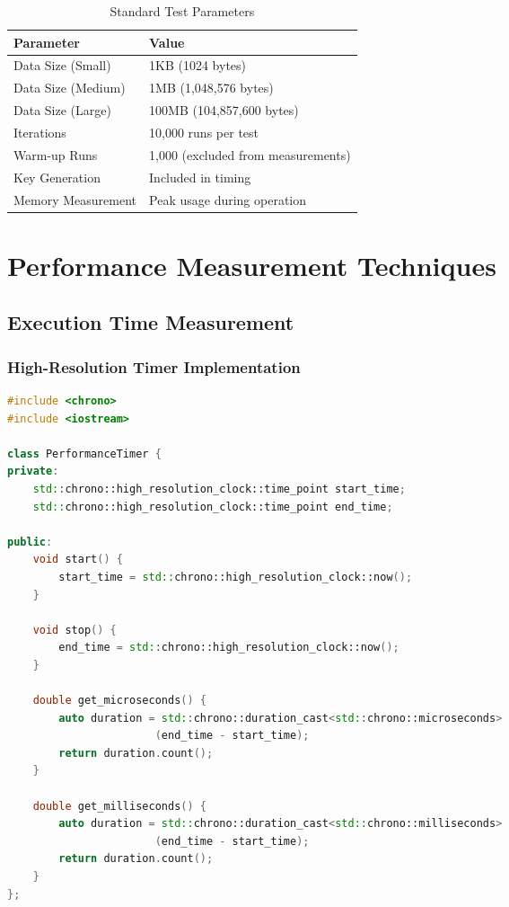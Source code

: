\documentclass[12pt,a4paper]{article}
\begin{document}
\begin{table}[h]
\centering
\caption{Standard Test Parameters}
\begin{tabular}{|l|l|}
\hline
\textbf{Parameter} & \textbf{Value} \\
\hline
Data Size (Small) & 1KB (1024 bytes) \\
Data Size (Medium) & 1MB (1,048,576 bytes) \\
Data Size (Large) & 100MB (104,857,600 bytes) \\
Iterations & 10,000 runs per test \\
Warm-up Runs & 1,000 (excluded from measurements) \\
Key Generation & Included in timing \\
Memory Measurement & Peak usage during operation \\
\hline
\end{tabular}
\end{table}

\section{Performance Measurement Techniques}

\subsection{Execution Time Measurement}

\subsubsection{High-Resolution Timer Implementation}

\begin{lstlisting}[language=C++, caption=High-Resolution Timer Code]
#include <chrono>
#include <iostream>

class PerformanceTimer {
private:
    std::chrono::high_resolution_clock::time_point start_time;
    std::chrono::high_resolution_clock::time_point end_time;
    
public:
    void start() {
        start_time = std::chrono::high_resolution_clock::now();
    }
    
    void stop() {
        end_time = std::chrono::high_resolution_clock::now();
    }
    
    double get_microseconds() {
        auto duration = std::chrono::duration_cast<std::chrono::microseconds>
                       (end_time - start_time);
        return duration.count();
    }
    
    double get_milliseconds() {
        auto duration = std::chrono::duration_cast<std::chrono::milliseconds>
                       (end_time - start_time);
        return duration.count();
    }
};
\end{lstlisting}
\end{document}
